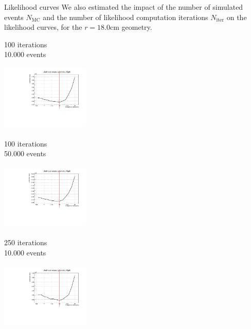 \documentclass[8 pt]{beamer}
\begin{document}
\begin{frame}{Likelihood curves}
\justifying
We also estimated the impact of the number of simulated events $N_{\text{MC}}$ and the number of likelihood computation iterations $N_{\text{iter}}$ on the likelihood curves, for the $r = 18.0$cm geometry.

\begin{minipage}[c]{.32\textwidth}
\begin{exampleblock}{} \begin{center}100 iterations \\ 10.000 events\end{center} \end{exampleblock} \vspace{5pt}
\includegraphics[width=4.2cm, height=3.2cm]{figs/likelihood100LowStat/likelihood18p0.pdf} 
\end{minipage}
\begin{minipage}[c]{.32\textwidth}
\begin{exampleblock}{} \begin{center}100 iterations \\ 50.000 events\end{center} \end{exampleblock} \vspace{5pt}
\includegraphics[width=4.2cm, height=3.2cm]{figs/likelihood100HighStat/likelihood18p0.pdf} 
\end{minipage}
\begin{minipage}[c]{.32\textwidth}
\begin{exampleblock}{} \begin{center}250 iterations \\ 10.000 events\end{center} \end{exampleblock} \vspace{5pt}
\includegraphics[width=4.2cm, height=3.2cm]{figs/likelihood250LowStat/likelihood18p0.pdf} 
\end{minipage} \vfill


\end{frame}
\end{document}
